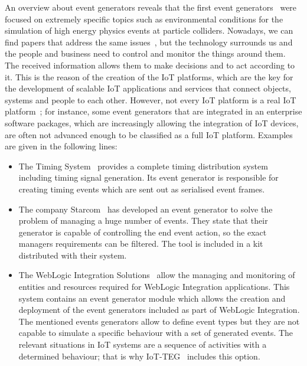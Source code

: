 \documentclass[journal]{IEEEtran}
\begin{document}
An overview about event generators reveals that the first event generators~\cite{dobbs2004houches,mangano2005tools}
were focused on extremely specific topics such as environmental conditions for the simulation of high energy 
physics events at particle colliders. Nowadays, we can find papers that address the same issues~\cite{Grzegorczyk}, but 
the technology surrounds us and the people and business need to control and monitor the things around them. 
The received information allows them to make decisions and to act according to it. This is the reason 
of the creation of the IoT platforms, which are the key for the development of scalable IoT applications and 
services that connect objects, systems and people to each other. However, not every IoT platform is a real IoT 
platform~\cite{iot-analytics:2015}; for instance, some event generators that are integrated in an enterprise 
software packages, which are increasingly allowing the integration of IoT devices, are often not advanced enough
to be classified as a full IoT platform. Examples are given in the following lines:

\begin{itemize}
 \item The Timing System~\cite{Finland:2016} provides a complete timing distribution system including timing signal 
 generation. Its event generator is responsible for creating timing events which are sent out as serialised event frames.
 \item The company Starcom~\cite{Starcom:2016} has developed an event generator to solve the problem of managing a huge 
 number of events. They state that their generator is capable of controlling the end event action, so the exact managers 
 requirements can be filtered. The tool is included in a kit distributed with their system.
 \item The WebLogic Integration Solutions~\cite{WebLogic:2016} allow the managing and monitoring of entities and 
 resources required for WebLogic Integration applications. This system contains an event generator module which allows the 
 creation and deployment of the event generators included as part of WebLogic Integration. The mentioned events 
 generators allow to define event types but they are not capable to simulate a specific behaviour with a set of 
 generated events. The relevant situations in IoT systems are a sequence of activities with a determined behaviour; 
 that is why IoT-TEG~\cite{TesisGutierrez2017,Gutierrez2017} includes this option.
\end{itemize}
\end{document}
